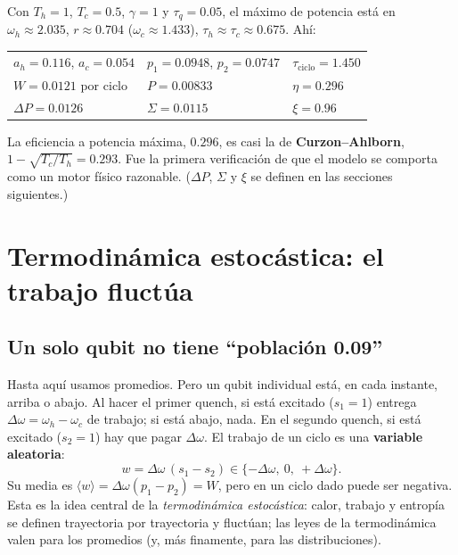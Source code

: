 \begin{ejemplo}
Con $T_h = 1$, $T_c = 0.5$, $\gamma = 1$ y $\tau_q = 0.05$, el máximo de potencia está en
$\omega_h \approx 2.035$, $r \approx 0.704$ ($\omega_c \approx 1.433$), $\tau_h \approx \tau_c \approx 0.675$.
Ahí:
\begin{center}
\begin{tabular}{lll}
\toprule
$a_h = 0.116$, $a_c = 0.054$ & $p_1 = 0.0948$, $p_2 = 0.0747$ & $\tau_{\mathrm{ciclo}} = 1.450$ \\
$W = 0.0121$ por ciclo & $P = 0.00833$ & $\eta = 0.296$ \\
$\Delta P = 0.0126$ & $\Sigma = 0.0115$ & $\xi = 0.96$ \\
\bottomrule
\end{tabular}
\end{center}
La eficiencia a potencia máxima, $0.296$, es casi la de \textbf{Curzon--Ahlborn},
$1-\sqrt{T_c/T_h} = 0.293$. Fue la primera verificación de que el modelo se comporta como un motor
físico razonable. ($\Delta P$, $\Sigma$ y $\xi$ se definen en las secciones siguientes.)
\end{ejemplo}

\section{Termodinámica estocástica: el trabajo fluctúa}

\subsection{Un solo qubit no tiene ``población 0.09''}

Hasta aquí usamos promedios. Pero un qubit individual está, en cada instante, arriba o abajo. Al
hacer el primer quench, si está excitado ($s_1 = 1$) entrega $\Delta\omega = \omega_h - \omega_c$ de
trabajo; si está abajo, nada. En el segundo quench, si está excitado ($s_2 = 1$) hay que pagar
$\Delta\omega$. El trabajo de un ciclo es una \textbf{variable aleatoria}:
\begin{equation}
w = \Delta\omega\,(s_1 - s_2) \in \{-\Delta\omega,\ 0,\ +\Delta\omega\}.
\end{equation}
Su media es $\langle w\rangle = \Delta\omega(p_1 - p_2) = W$, pero en un ciclo dado puede ser
negativa. Esta es la idea central de la \emph{termodinámica estocástica}: calor, trabajo y entropía
se definen trayectoria por trayectoria y fluctúan; las leyes de la termodinámica valen para los
promedios (y, más finamente, para las distribuciones).

